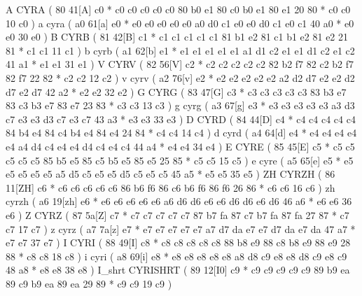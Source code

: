 \makeCOD A            CYRA              ( 80 41[A]   c0 *   c0 c0 c0 c0    c0 80 b0 e1 80    c0 b0 e1 80    e1 20 80    *   c0 c0   10 c0  )
\makecod a            cyra              ( a0 61[a]   e0 *   e0 e0 e0 e0    e0 a0 d0 c1 e0    e0 d0 c1 e0    c1 40 a0    *   e0 e0   30 e0  )
\makeCOD B            CYRB              ( 81 42[B]   c1 *   c1 c1 c1 c1    c1 81 b1 e2 81    c1 b1 e2 81    e2 21 81    *   c1 c1   11 c1  )
\makecod b            cyrb              ( a1 62[b]   e1 *   e1 e1 e1 e1    e1 a1 d1 c2 e1    e1 d1 c2 e1    c2 41 a1    *   e1 e1   31 e1  )
\makeCOD V            CYRV              ( 82 56[V]   c2 *   c2 c2 c2 c2    c2 82 b2 f7 82    c2 b2 f7 82    f7 22 82    *   c2 c2   12 c2  )
\makecod v            cyrv              ( a2 76[v]   e2 *   e2 e2 e2 e2    e2 a2 d2 d7 e2    e2 d2 d7 e2    d7 42 a2    *   e2 e2   32 e2  )
\makeCOD G            CYRG              ( 83 47[G]   c3 *   c3 c3 c3 c3    c3 83 b3 e7 83    c3 b3 e7 83    e7 23 83    *   c3 c3   13 c3  )
\makecod g            cyrg              ( a3 67[g]   e3 *   e3 e3 e3 e3    e3 a3 d3 c7 e3    e3 d3 c7 e3    c7 43 a3    *   e3 e3   33 e3  )
\makeCOD D            CYRD              ( 84 44[D]   c4 *   c4 c4 c4 c4    c4 84 b4 e4 84    c4 b4 e4 84    e4 24 84    *   c4 c4   14 c4  )
\makecod d            cyrd              ( a4 64[d]   e4 *   e4 e4 e4 e4    e4 a4 d4 c4 e4    e4 d4 c4 e4    c4 44 a4    *   e4 e4   34 e4  )
\makeCOD E            CYRE              ( 85 45[E]   c5 *   c5 c5 c5 c5    c5 85 b5 e5 85    c5 b5 e5 85    e5 25 85    *   c5 c5   15 c5  )
\makecod e            cyre              ( a5 65[e]   e5 *   e5 e5 e5 e5    e5 a5 d5 c5 e5    e5 d5 c5 e5    c5 45 a5    *   e5 e5   35 e5  )
\makeCOD ZH           CYRZH             ( 86 11[ZH]  c6 *   c6 c6 c6 c6    c6 86 b6 f6 86    c6 b6 f6 86    f6 26 86    *   c6 c6   16 c6  )
\makecod zh           cyrzh             ( a6 19[zh]  e6 *   e6 e6 e6 e6    e6 a6 d6 d6 e6    e6 d6 d6 e6    d6 46 a6    *   e6 e6   36 e6  )
\makeCOD Z            CYRZ              ( 87 5a[Z]   c7 *   c7 c7 c7 c7    c7 87 b7 fa 87    c7 b7 fa 87    fa 27 87    *   c7 c7   17 c7  )
\makecod z            cyrz              ( a7 7a[z]   e7 *   e7 e7 e7 e7    e7 a7 d7 da e7    e7 d7 da e7    da 47 a7    *   e7 e7   37 e7  )
\makeCOD I            CYRI              ( 88 49[I]   c8 *   c8 c8 c8 c8    c8 88 b8 e9 88    c8 b8 e9 88    e9 28 88    *   c8 c8   18 c8  )
\makecod i            cyri              ( a8 69[i]   e8 *   e8 e8 e8 e8    e8 a8 d8 c9 e8    e8 d8 c9 e8    c9 48 a8    *   e8 e8   38 e8  )
\makeCOD I_shrt       CYRISHRT          ( 89 12[I0]  c9 *   c9 c9 c9 c9    c9 89 b9 ea 89    c9 b9 ea 89    ea 29 89    *   c9 c9   19 c9  )
